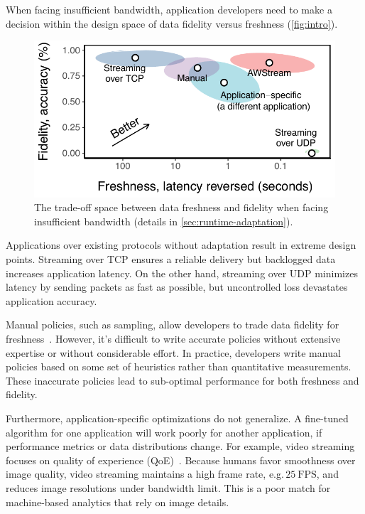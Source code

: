 When facing insufficient bandwidth, application developers need to make a
decision within the design space of data fidelity versus freshness (\autoref{fig:intro}).

\begin{figure}
  \centering
  \includegraphics[width=0.9\columnwidth]{figures/figure1a.pdf}
  \caption{The trade-off space between data freshness and fidelity when
    facing insufficient bandwidth (details in \autoref{sec:runtime-adaptation}).}
  \label{fig:intro}
  \vspace{-1em}
\end{figure}

Applications over existing protocols without adaptation result in
extreme design points. Streaming over TCP ensures a reliable
delivery but backlogged data increases application latency. On the other hand, streaming over
UDP minimizes latency by sending packets as fast as possible, but
uncontrolled loss devastates application accuracy.

Manual policies, such as sampling, allow developers to trade data
fidelity for freshness~\cite{rabkin2014aggregation}.
However, it's difficult to write accurate policies without extensive expertise or without considerable effort.
In practice, developers write manual policies based on some set of heuristics rather than quantitative measurements.
These inaccurate policies lead to sub-optimal performance for both freshness and fidelity.

Furthermore, application-specific optimizations do not generalize. A fine-tuned algorithm for one application will work poorly for another application, if
performance metrics or data distributions change.
For example, video streaming focuses on quality of experience (QoE)~\cite{yin2015control}.
Because humans favor smoothness over image quality,
video streaming maintains a high frame rate, e.g.\,\(25~\text{FPS}\),
and reduces image resolutions under bandwidth limit.
This is a poor match for machine-based analytics that rely on image details.

